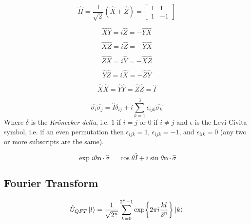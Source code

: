 \documentclass[reprint, amsmath,amssymb, aps]{revtex4-2}
\begin{document}
        \begin{equation} \label{eqn:pauli-z}
            \hat{H} = \frac{1}{\sqrt{2}}(\hat{X}+\hat{Z}) = \begin{bmatrix} 1 & 1 \\ 1 & -1\end{bmatrix}
        \end{equation}

        \begin{equation} \label{eqn:pauli-xy}
            \hat{X}\hat{Y} = i\hat{Z} = -\hat{Y}\hat{X}
        \end{equation}

        \begin{equation} \label{eqn:pauli-xy}
            \hat{X}\hat{Z} = i\hat{Z} = -\hat{Y}\hat{X}
        \end{equation}

        \begin{equation} \label{eqn:pauli-zx}
            \hat{Z}\hat{X} = i\hat{Y} = -\hat{X}\hat{Z}
        \end{equation}

        \begin{equation} \label{eqn:pauli-zx}
            \hat{Y}\hat{Z} = i\hat{X} = -\hat{Z}\hat{Y}
        \end{equation}

        \begin{equation} \label{eqn:pauli-id}
            \hat{X}\hat{X} = \hat{Y}\hat{Y} = \hat{Z}\hat{Z} = \hat{I}
        \end{equation}

        \begin{equation} \label{eqn:pauli-levicevita}
            \hat{\sigma_i}\hat{\sigma_j} = \hat{I}\delta_{ij}+i\sum\limits_{k=1}^{3}\epsilon_{ijk}\hat{\sigma_k}
        \end{equation}
        Where $\delta$ is the \textit{Kr{\"o}necker delta}, i.e. $1$ if $i=j$ or $0$ if $i\neq j$ and $\epsilon$ is the Levi-Civita symbol, i.e. if an even permutation then $\epsilon_{ijk} = 1$, $\epsilon_{ijk} = -1$, and $\epsilon_{iik} = 0$ (any two or more subscripts are the same).

        \begin{equation} \label{eqn:pauli-euler}
            \exp{i\theta \mathbf{n}\cdot\hat{\sigma}} = \cos\theta\hat{I}+i\sin\theta\mathbf{n}\cdot\hat{\sigma}
        \end{equation}

        \subsection{Fourier Transform}
        \begin{equation} \label{eqn:QFT-nqubit}
            \hat{U}_{QFT}\ket{l} = \frac{1}{\sqrt{2^n}}\sum\limits_{k=0}^{2^n-1}\exp{2\pi i\frac{kl}{2^n}}\ket{k}
        \end{equation}
\end{document}
